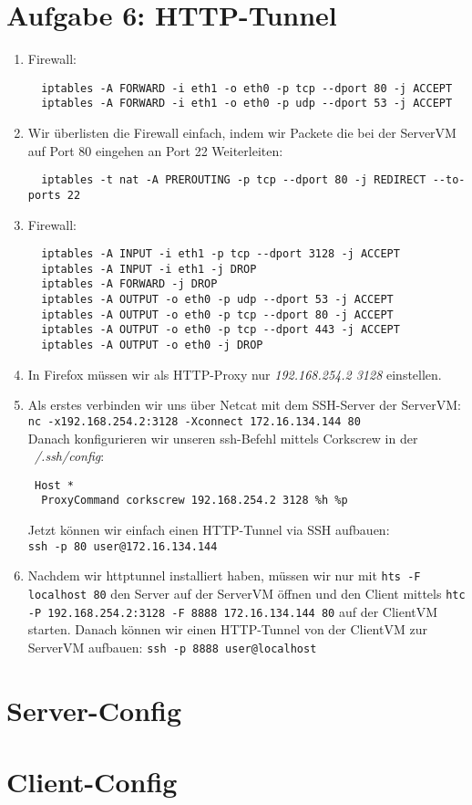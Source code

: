 \documentclass{scrartcl}
\begin{document}
	\section*{Aufgabe 6: HTTP-Tunnel}
	\label{sec:Aufgabe 6: HTTP-Tunnel}
	\begin{enumerate}[\bfseries 1.]
		\item Firewall:
		      \begin{lstlisting}
  iptables -A FORWARD -i eth1 -o eth0 -p tcp --dport 80 -j ACCEPT
  iptables -A FORWARD -i eth1 -o eth0 -p udp --dport 53 -j ACCEPT
		\end{lstlisting}
		\item Wir überlisten die Firewall einfach, indem wir Packete die bei der
		      ServerVM auf Port 80 eingehen an Port 22 Weiterleiten:
		      \begin{lstlisting}
  iptables -t nat -A PREROUTING -p tcp --dport 80 -j REDIRECT --to-ports 22
		\end{lstlisting}
		\item Firewall:
		      \begin{lstlisting}
  iptables -A INPUT -i eth1 -p tcp --dport 3128 -j ACCEPT
  iptables -A INPUT -i eth1 -j DROP
  iptables -A FORWARD -j DROP
  iptables -A OUTPUT -o eth0 -p udp --dport 53 -j ACCEPT
  iptables -A OUTPUT -o eth0 -p tcp --dport 80 -j ACCEPT
  iptables -A OUTPUT -o eth0 -p tcp --dport 443 -j ACCEPT
  iptables -A OUTPUT -o eth0 -j DROP
		\end{lstlisting}
		\item In Firefox müssen wir als HTTP-Proxy nur \textit{192.168.254.2
			3128} einstellen.
			\item
			      Als erstes verbinden wir uns über Netcat mit dem SSH-Server der ServerVM:\\
			      \texttt{nc -x192.168.254.2:3128 -Xconnect 172.16.134.144 80}\\
			      Danach konfigurieren wir unseren ssh-Befehl mittels Corkscrew in der
			      \textit{~/.ssh/config}:\\
			      \begin{lstlisting}
 Host *
  ProxyCommand corkscrew 192.168.254.2 3128 %h %p
			\end{lstlisting}
			Jetzt können wir einfach einen HTTP-Tunnel via SSH aufbauen:\\
			\texttt{ssh -p 80 user@172.16.134.144}
			\item Nachdem wir httptunnel installiert haben, müssen wir nur mit
			      \texttt{hts -F localhost 80} den Server auf der ServerVM öffnen und
			      den Client mittels \texttt{htc -P 192.168.254.2:3128 -F 8888
			      172.16.134.144 80} auf der ClientVM starten. Danach können wir einen
			      HTTP-Tunnel von der ClientVM zur ServerVM aufbauen:
			      \texttt{ssh -p 8888 user@localhost}
		\end{enumerate}

    \begin{appendices}
      \section{Server-Config}
      
      \section{Client-Config}
      
  \end{appendices}
\end{document}
